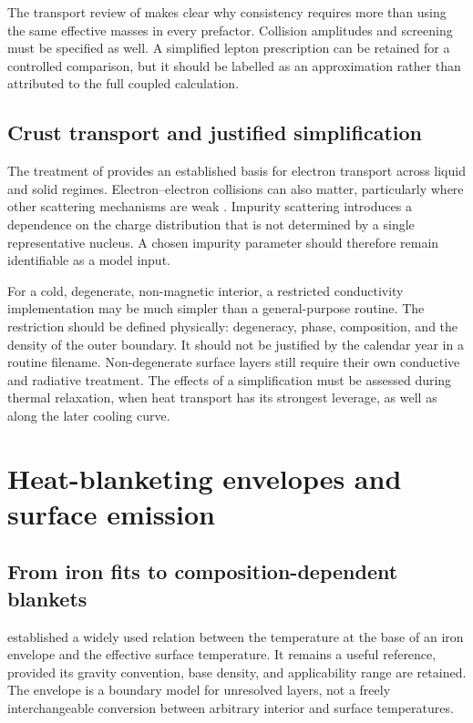 \documentclass{aa}
\begin{document}
The transport review of \citet{Schmitt2018} makes clear why consistency requires more than using the same effective masses in every prefactor. Collision amplitudes and screening must be specified as well. A simplified lepton prescription can be retained for a controlled comparison, but it should be labelled as an approximation rather than attributed to the full coupled calculation.

\subsection{Crust transport and justified simplification}
The treatment of \citet{Potekhin1999} provides an established basis for electron transport across liquid and solid regimes. Electron--electron collisions can also matter, particularly where other scattering mechanisms are weak \citep{Shternin2006}. Impurity scattering introduces a dependence on the charge distribution that is not determined by a single representative nucleus. A chosen impurity parameter should therefore remain identifiable as a model input.

For a cold, degenerate, non-magnetic interior, a restricted conductivity implementation may be much simpler than a general-purpose routine. The restriction should be defined physically: degeneracy, phase, composition, and the density of the outer boundary. It should not be justified by the calendar year in a routine filename. Non-degenerate surface layers still require their own conductive and radiative treatment. The effects of a simplification must be assessed during thermal relaxation, when heat transport has its strongest leverage, as well as along the later cooling curve.

\section{Heat-blanketing envelopes and surface emission}
\subsection{From iron fits to composition-dependent blankets}
\citet{Gudmundsson1983} established a widely used relation between the temperature at the base of an iron envelope and the effective surface temperature. It remains a useful reference, provided its gravity convention, base density, and applicability range are retained. The envelope is a boundary model for unresolved layers, not a freely interchangeable conversion between arbitrary interior and surface temperatures.
\end{document}
